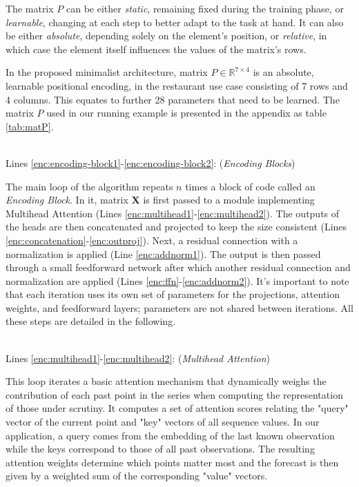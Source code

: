 \documentclass[algorithms,article,submit,pdftex,moreauthors]{Definitions/mdpi}
\begin{document}
The matrix $P$ can be either \textit{static}, remaining fixed during the training phase, or \textit{learnable}, changing at each step to better adapt to the task at hand. It can also be either \textit{absolute}, depending solely on the element's position, or \textit{relative}, in which case the element itself influences the values of the matrix's rows. 

In the proposed minimalist architecture, matrix $P \in \mathbb{R}^{7 \times 4}$ is an absolute, learnable positional encoding, in the restaurant use case consisting of 7 rows and 4 columns. This equates to further 28 parameters that need to be learned. The matrix $P$ used in our running example is presented in the appendix as table \ref{tab:matP}. 

~\\Lines \ref{enc:encoding-block1}-\ref{enc:encoding-block2}: (\textit{Encoding Blocks})

The main loop of the algorithm repeats $n$ times a block of code called an {\it Encoding Block}. In it, matrix {\bf X} is first passed to a module implementing Multihead Attention (Lines \ref{enc:multihead1}-\ref{enc:multihead2}). The outputs of the heads are then concatenated and projected to keep the size consistent (Lines \ref{enc:concatenation}-\ref{enc:outproj}). Next, a residual connection with a normalization is applied (Line \ref{enc:addnorm1}). The output is then passed through a small feedforward network after which another residual connection and normalization are applied (Lines \ref{enc:ffn}-\ref{enc:addnorm2}).
It's important to note that each iteration uses its own set of parameters for the projections, attention weights, and feedforward layers; parameters are not shared between iterations.
All these steps are detailed in the following.

~\\Lines \ref{enc:multihead1}-\ref{enc:multihead2}: (\textit{Multihead Attention})

This loop iterates a basic attention mechanism that dynamically weighs the contribution of each past point in the series when computing the representation of those under scrutiny. It computes a set of attention scores relating the "query" vector of the current point and "key" vectors of all sequence values. In our application, a query comes from the embedding of the last known observation while the keys correspond to those of all past observations. The resulting attention weights determine which points matter most and the forecast is then given by a weighted sum of the corresponding "value" vectors.
\end{document}
